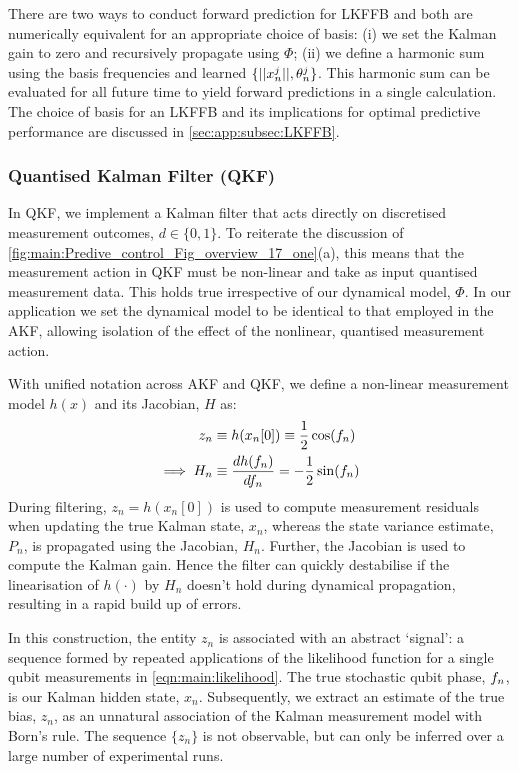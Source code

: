 There are two ways to conduct forward prediction for LKFFB and both are numerically equivalent for an appropriate choice of basis: (i) we set the Kalman gain to zero and recursively propagate using $\Phi$; (ii) we define a harmonic sum using the basis frequencies and learned $\{||x^j_n||, \theta^{j}_{n} \}$.  This harmonic sum can be evaluated for all future time to yield forward predictions in a single calculation. The choice of basis for an LKFFB and its implications for optimal predictive performance are discussed in \cref{sec:app:subsec:LKFFB}.





\subsubsection{Quantised Kalman Filter (QKF)}

In QKF, we implement a Kalman filter that acts directly on discretised measurement outcomes, $d \in \{0,1\}$. To reiterate the discussion of  \cref{fig:main:Predive_control_Fig_overview_17_one}(a), this means that the measurement action in QKF must be non-linear and take as input quantised measurement data. This holds true irrespective of our dynamical model, $\Phi$.  In our application we set the dynamical model to be identical to that employed in the AKF, allowing isolation of the effect of the nonlinear, quantised measurement action.

With unified notation across AKF and QKF, we define a non-linear measurement model $h(x)$ and its Jacobian, $H$ as:
\begin{align}
	z_n &  \equiv h(x_n[0]) \equiv \frac{1}{2}\cos(f_{n}) \\
	\implies H_n &\equiv \frac{d h(f_n)}{df_n} =  -\frac{1}{2}\sin(f_{n})
\end{align}
During filtering, $z_n = h(x_n[0])$ is used to compute measurement residuals when updating the true Kalman state, $x_n$, whereas the state variance estimate, $P_n$, is propagated using the Jacobian, $H_n$. Further, the Jacobian  is used to compute the Kalman gain. Hence the filter can quickly destabilise if the linearisation of $h(\cdot)$ by $H_n$ doesn't hold during dynamical propagation, resulting in a rapid build up of errors. 

In this construction, the entity $z_n$ is associated with an abstract `signal': a sequence formed by repeated applications of the likelihood function for a single qubit measurements in \cref{eqn:main:likelihood}.  The true stochastic qubit phase, $f_n$, is our Kalman hidden state, $x_n$. Subsequently, we extract an estimate of the true bias, $z_n$, as an unnatural association of the Kalman measurement model with Born's rule. The sequence $\{z_n\}$ is not observable, but can only be inferred over a large number of experimental runs. 

